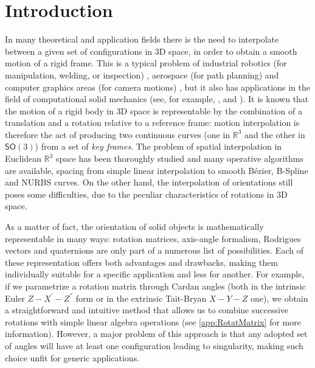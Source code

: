 \section{Introduction}
\label{sec:introduction}
In many theoretical and application fields there is the need to interpolate between a given set of configurations in 3D space, in order to obtain a smooth motion of a rigid frame. This is a typical problem of industrial robotics (for manipulation, welding, or inspection) \cite{li2009research} \cite{neubauer2015smooth}, aerospace (for path planning) \cite{yongguo2010trajectory} and computer graphics areas (for camera motions) \cite{shoemake1985animating}, but it also has applications in the field of computational solid mechanics (see, for example, \cite{romero2004interpolation}, \cite{ghosh2008consistent} and \cite{bauchau2014interpolation}). It is known that the motion of a rigid body in 3D space is representable by the combination of a translation and a rotation relative to a reference frame: motion interpolation is therefore the act of producing two continuous curves (one in $\mathbb{R}^{3}$ and the other in $\mathsf{SO}(3)$) from a set of \emph{key frames}. The problem of spatial interpolation in Euclidean $\mathbb{R}^{3}$ space has been thoroughly studied and many operative algorithms are available, spacing from simple linear interpolation to smooth B\'ezier, B-Spline and NURBS curves. On the other hand, the interpolation of orientations still poses some difficulties, due to the peculiar characteristics of rotations in 3D space.

As a matter of fact, the orientation of solid objects is mathematically representable in many ways: rotation matrices, axis-angle formalism, Rodrigues vectors and quaternions are only part of a numerous list of possibilities. Each of these representation offers both advantages and drawbacks, making them individually suitable for a specific application and less for another. For example, if we parametrize a rotation matrix through Cardan angles (both in the intrinsic Euler $Z-X^{'}-Z^{''}$ form or in the extrinsic Tait-Bryan $X-Y-Z$ one), we obtain a straightforward and intuitive method that allows us to combine successive rotations with simple linear algebra operations (see \ref{app:RotatMatrix} for more information). However, a major problem of this approach is that any adopted set of angles will have at least one configuration leading to singularity, making such choice unfit for generic applications.

